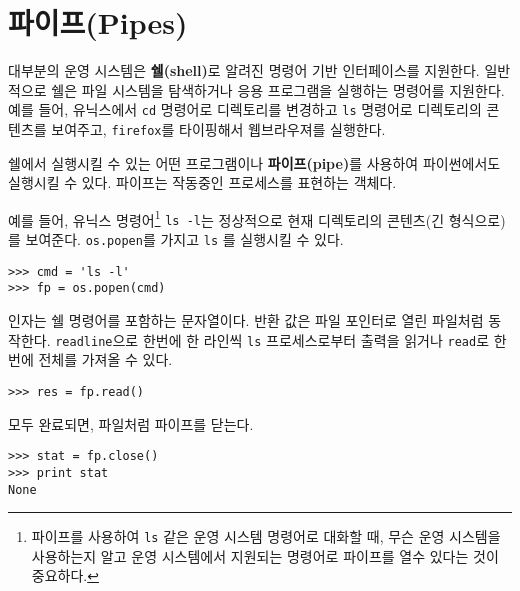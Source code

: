 \section{파이프(Pipes)}


대부분의 운영 시스템은 {\bf 쉘(shell)}로 알려진 명령어 기반 인터페이스를 지원한다.
일반적으로 쉘은 파일 시스템을 탐색하거나 응용 프로그램을 실행하는 명령어를 지원한다.
예를 들어, 유닉스에서 {\tt cd} 명령어로 디렉토리를 변경하고 {\tt ls} 명령어로 디렉토리의 콘텐츠를 보여주고,
{\tt firefox}를 타이핑해서 웹브라우져를 실행한다.


쉘에서 실행시킬 수 있는 어떤 프로그램이나 {\bf 파이프(pipe)}를 사용하여 파이썬에서도 실행시킬 수 있다.
파이프는 작동중인 프로세스를 표현하는 객체다.

예를 들어, 유닉스 명령어\footnote{ 파이프를 사용하여 {\tt ls} 같은 운영 시스템 명령어로 대화할 때,
무슨 운영 시스템을 사용하는지 알고 운영 시스템에서 지원되는 명령어로 파이프를 열수 있다는 것이 중요하다.}
{\tt ls -l}는 정상적으로 현재 디렉토리의 콘텐츠(긴 형식으로)를 보여준다.
{\tt os.popen}를 가지고 {\tt ls} 를 실행시킬 수 있다.


\beforeverb
\begin{verbatim}
>>> cmd = 'ls -l'
>>> fp = os.popen(cmd)
\end{verbatim}
\afterverb
%

인자는 쉘 명령어를 포함하는 문자열이다. 
반환 값은 파일 포인터로 열린 파일처럼 동작한다.
{\tt readline}으로 한번에 한 라인씩 {\tt ls} 프로세스로부터 출력을 읽거나 
{\tt read}로 한번에 전체를 가져올 수 있다.


\beforeverb
\begin{verbatim}
>>> res = fp.read()
\end{verbatim}
\afterverb
%

모두 완료되면, 파일처럼 파이프를 닫는다.


\beforeverb
\begin{verbatim}
>>> stat = fp.close()
>>> print stat
None
\end{verbatim}
\afterverb
%

